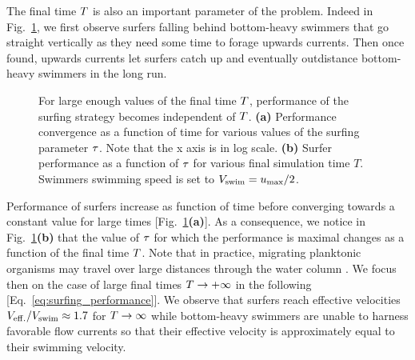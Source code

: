 The final time $\FinalTime$ is also an important parameter of the problem. 
Indeed in Fig.~\ref{fig:taylor_green_vortex_time_performance_tau_and_tau_performance_final_time}, we first observe surfers falling behind bottom-heavy swimmers that go straight vertically as they need some time to forage upwards currents.
Then once found, upwards currents let surfers catch up and eventually outdistance bottom-heavy swimmers in the long run.
\begin{figure}%
	\centering
	
	\caption[For large enough values of the final time $\FinalTime$, performance of the surfing strategy becomes independent of $\FinalTime$.]{
		For large enough values of the final time $\FinalTime$, performance of the surfing strategy becomes independent of $\FinalTime$.
		\textbf{(a)} Performance convergence as a function of time for various values of the surfing parameter $\tau$.
		Note that the x axis is in log scale.
		\textbf{(b)} Surfer performance as a function of $\tau$ for various final simulation time $T$.
		Swimmers swimming speed is set to $V_{\mathrm{swim}} = u_{\mathrm{max}}/2$.
	}
	\label{fig:taylor_green_vortex_time_performance_tau_and_tau_performance_final_time}
\end{figure}
Performance of surfers increase as function of time before converging towards a constant value for large times [Fig.~\ref{fig:taylor_green_vortex_time_performance_tau_and_tau_performance_final_time}\textbf{(a)}].
As a consequence, we notice in Fig.~\ref{fig:taylor_green_vortex_time_performance_tau_and_tau_performance_final_time}\textbf{(b)} that the value of $\tau$ for which the performance is maximal changes as a function of the final time $\FinalTime$.
Note that in practice, migrating planktonic organisms may travel over large distances through the water column \citep{hardy1954experimental, williamson2011toward, prairie2012biophysical}.
We focus then on the case of large final times $T \to +\infty$ in the following [Eq.~\eqref{eq:surfing_performance}].
We observe that surfers reach effective velocities $V_{\mathrm{eff.}}/V_{\mathrm{swim}} \approx 1.7$ for $T \to \infty$ while bottom-heavy swimmers are unable to harness favorable flow currents so that their effective velocity is approximately equal to their swimming velocity.

